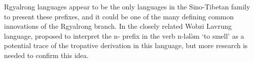 \documentclass[oldfontcommands,twoside,a4paper,12pt]{article}
\newcommand{\ipa}[1]{{\phon \mbox{#1}}} %
\begin{document}
Rgyalrong languages appear to be the only languages in the Sino-Tibetan family to present these prefixes, and it could be one of the many defining common innovations of the Rgyalrong branch. In the closely related Wobzi Lavrung language, \citet[165]{lai13affixale} proposed to interpret the \ipa{n-} prefix in the verb \ipa{n-lələ̀m} `to smell' as a potential trace of the tropative derivation in this language, but more research is needed to confirm this idea.
 
 \titleformat{\section}{\large\bfseries\center}{}{0pt}{}



\end{document}
